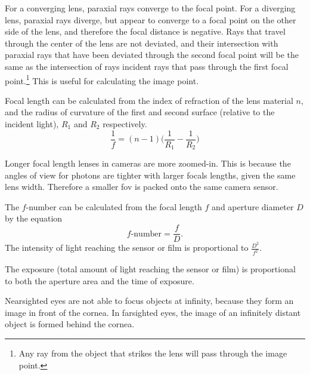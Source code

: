 \documentclass[nobib,notoc]{tufte-handout}
\begin{document}
\begin{rema}
	For a converging lens, paraxial rays converge to the focal point. For a diverging lens, paraxial rays diverge, but appear to converge to a focal point on the other side of the lens, and therefore the focal distance is negative. Rays that travel through the center of the lens are not deviated, and their intersection with paraxial rays that have been deviated through the second focal point will be the same as the intersection of rays incident rays that pass through the first focal point.\footnote{Any ray from the object that strikes the lens will pass through the image point.} This is useful for calculating the image point.
\end{rema}
\begin{defi}
	Focal length can be calculated from the index of refraction of the lens material \(n\), and the radius of curvature of the first and second surface (relative to the incident light), \(R_1\) and \(R_2\) respectively.
	\begin{equation*}
		\frac{1}{f}=(n-1)\big(\frac{1}{R_1}-\frac{1}{R_2}\big)
	\end{equation*}
\end{defi}
\begin{rema}
	Longer focal length lenses in cameras are more zoomed-in. This is because the angles of view for photons are tighter with larger focals lengths, given the same lens width. Therefore a smaller fov is packed onto the same camera sensor.
\end{rema}
\begin{defi}
	The \(f\)-number can be calculated from the focal length \(f\) and aperture diameter \(D\) by the equation
	\begin{equation*}
		f\text{-number}=\frac{f}{D}.
	\end{equation*}
		The intensity of light reaching the sensor or film is proportional to \(\frac{D^2}{f^2}\).
\end{defi}
\begin{rema}
	The exposure (total amount of light reaching the sensor or film) is proportional to both the aperture area and the time of exposure.
\end{rema}
\begin{defi}
	Nearsighted eyes are not able to focus objects at infinity, because they form an image in front of the cornea. In farsighted eyes, the image of an infinitely distant object is formed behind the cornea.
\end{defi}
\end{document}
